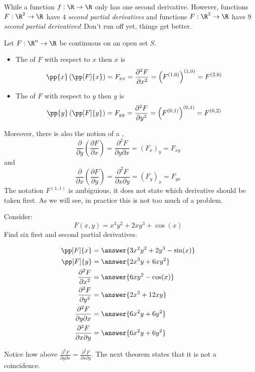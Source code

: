 \documentclass{ximera}
\begin{document}
While a function $f:\R\to\R$ only has one second derivative. However,
functions $F:\R^2\to \R$ have $4$ \textit{second partial derivatives}
and functions $F:\R^3\to\R$ have $9$ \textit{second partial
  derivatives}! Don't run off yet, things get better.

\begin{definition}
  Let $F:\R^n\to\R$ be continuous on an open set $S$.
  \begin{itemize}
  \item The  of $F$ with respect to $x$ then $x$ is
    \[
    \pp{x}\left(\pp[F]{x}\right) = F_{xx}=\frac{\partial^2 F}{\partial x^2} = \left(F^{(1,0)}\right)^{(1,0)}= F^{(2,0)}
    \]
  \item The  of $F$ with respect to
    $y$ then $y$ is
    \[
    \pp{y}\left(\pp[F]{y}\right) = F_{yy}=\frac{\partial^2F}{\partial y^2} = \left(F^{(0,1)}\right)^{(0,1)} = F^{(0,2)}
    \]
\end{itemize}
Moreover, there is also the notion of
a ,
\[
\frac{\partial}{\partial y}\left(\frac{\partial F}{\partial x}\right) = \frac{\partial^2F}{\partial y\partial x} = \left(F_x\right)_y = F_{xy}
\]
and
\[
\frac{\partial}{\partial x}\left(\frac{\partial F}{\partial y}\right) = \frac{\partial^2F}{\partial x\partial y} = \left(F_y\right)_x =F_{yx}
\]
The notation $F^{(1,1)}$ is ambiguious, it does not state which
derivative should be taken first. As we will see, in practice this is
not too much of a problem.
\end{definition}


\begin{question}
  Consider:
  \[
  F(x,y) = x^3y^2 + 2xy^3+\cos(x)
  \]
  Find six first and second partial derivatives.
  \begin{prompt}
    \begin{align*}
      \pp[F]{x} &= \answer{3x^2y^2+2y^3-\sin(x)}\\
      \pp[F]{y} &= \answer{2x^3y+6xy^2}\\
      \frac{\partial^2F}{\partial x^2} &= \answer{6xy^2-\cos(x)}\\
      \frac{\partial^2F}{\partial y^2} &= \answer{2x^3+12xy}\\
      \frac{\partial^2F}{\partial y\partial x} &= \answer{6x^2y+6y^2}\\
      \frac{\partial^2F}{\partial x\partial y} &= \answer{6x^2y+6y^2}
    \end{align*}
  \end{prompt}
\end{question}
Notice how above $\frac{\partial^2F}{\partial y\partial
  x}=\frac{\partial^2F}{\partial x\partial y}$. The next theorem states
that it is not a coincidence.
\end{document}
